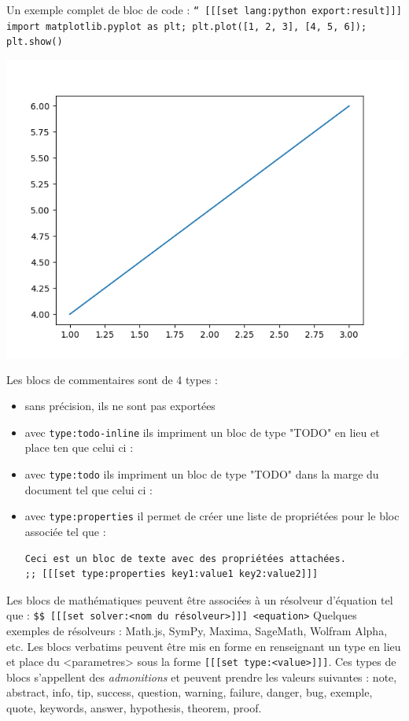 \documentclass[a4paper,12pt]{article}
\begin{document}
Un exemple complet de bloc de code : \breakline
\texttt{`` [[[set lang:python export:result]]] import matplotlib.pyplot as plt; plt.plot([1, 2, 3], [4, 5, 6]); plt.show()}

\begin{center}
\includegraphics[width=.9\linewidth]{./quickDoc-exemple-code.png}
\end{center}

\newline
Les blocs de commentaires sont de 4 types :
\begin{itemize}
\item sans précision, ils ne sont pas exportées
\item avec \texttt{type:todo-inline} ils impriment un bloc de type "TODO" en lieu et place ten que celui ci : 
\item avec \texttt{type:todo} ils impriment un bloc de type "TODO" dans la marge du document tel que celui ci : 
\item avec \texttt{type:properties} il permet de créer une liste de propriétées pour le bloc associée tel que :
\begin{verbatim}
Ceci est un bloc de texte avec des propriétées attachées.
;; [[[set type:properties key1:value1 key2:value2]]]
\end{verbatim}
\end{itemize}
\newline
Les blocs de mathématiques peuvent être associées à un résolveur d'équation tel que :
\texttt{\$\$ [[[set solver:<nom du résolveur>]]] <equation>}
Quelques exemples de résolveurs : Math.js, SymPy, Maxima, SageMath, Wolfram Alpha, etc.
\newline
Les blocs verbatims peuvent être mis en forme en renseignant un type en lieu et place du <parametres> sous la forme \texttt{[[[set type:<value>]]]}. Ces types de blocs s'appellent des \emph{admonitions}\autocite{donathAdmonitionsMaterialMkDocs} et peuvent prendre les valeurs suivantes : note, abstract, info, tip, success, question, warning, failure, danger, bug, exemple, quote, keywords, answer, hypothesis, theorem, proof.
\end{document}
